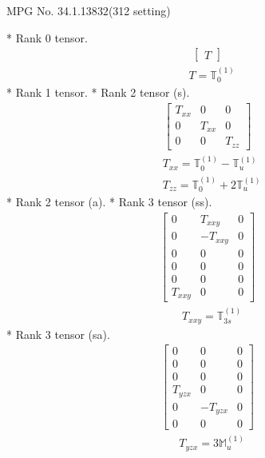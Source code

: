 \documentclass[fleqn,8pt,landscape]{jsarticle}
\begin{document}
\setcounter{MaxMatrixCols}{32}

\renewcommand{\tablename}{Table~}
\renewcommand{\figurename}{Figure~}
\begin{center}
\LARGE
MPG No. 34.1.138\quad$32$\quad(312 setting)
\end{center}
* Rank 0 tensor.
\begin{align*}
\begin{bmatrix} T \end{bmatrix}
\end{align*}
\begin{align*}
& T = \mathbb{T}_{0}^{(1)}
\end{align*}
* Rank 1 tensor.
* Rank 2 tensor (s).
\begin{align*}
\begin{bmatrix} T_{xx} & 0 & 0 \\ 0 & T_{xx} & 0 \\ 0 & 0 & T_{zz} \end{bmatrix}
\end{align*}
\begin{align*}
& T_{xx} = \mathbb{T}_{0}^{(1)} - \mathbb{T}_{u}^{(1)} \\
& T_{zz} = \mathbb{T}_{0}^{(1)} + 2 \mathbb{T}_{u}^{(1)}
\end{align*}
* Rank 2 tensor (a).
* Rank 3 tensor (ss).
\begin{align*}
\begin{bmatrix} 0 & T_{xxy} & 0 \\ 0 & - T_{xxy} & 0 \\ 0 & 0 & 0 \\ 0 & 0 & 0 \\ 0 & 0 & 0 \\ T_{xxy} & 0 & 0 \end{bmatrix}
\end{align*}
\begin{align*}
& T_{xxy} = \mathbb{T}_{3s}^{(1)}
\end{align*}
* Rank 3 tensor (sa).
\begin{align*}
\begin{bmatrix} 0 & 0 & 0 \\ 0 & 0 & 0 \\ 0 & 0 & 0 \\ T_{yzx} & 0 & 0 \\ 0 & - T_{yzx} & 0 \\ 0 & 0 & 0 \end{bmatrix}
\end{align*}
\begin{align*}
& T_{yzx} = 3 \mathbb{M}_{u}^{(1)}
\end{align*}
\end{document}
